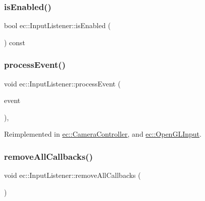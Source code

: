 \mbox{\label{classec_1_1_input_listener_a6d7a4e04543e3a86745261d9fefcbfc1}} 
\subsubsection{\texorpdfstring{is\+Enabled()}{isEnabled()}}
{\footnotesize\ttfamily bool ec\+::\+Input\+Listener\+::is\+Enabled (\begin{DoxyParamCaption}{ }\end{DoxyParamCaption}) const\hspace{0.3cm}{\ttfamily [virtual]}}

\mbox{\label{classec_1_1_input_listener_a9ceaefc79c6b0b260e88454616137840}} 
\subsubsection{\texorpdfstring{process\+Event()}{processEvent()}}
{\footnotesize\ttfamily void ec\+::\+Input\+Listener\+::process\+Event (\begin{DoxyParamCaption}\item[{const \mbox{\hyperlink{structec_1_1_input_event}{Input\+Event}} \&}]{event }\end{DoxyParamCaption})\hspace{0.3cm}{\ttfamily [protected]}, {\ttfamily [virtual]}}



Reimplemented in \mbox{\hyperlink{classec_1_1_camera_controller_af44aad5f80005eaadf5d637b3b00c6d6}{ec\+::\+Camera\+Controller}}, and \mbox{\hyperlink{classec_1_1_open_g_l_input_a064a4e318e18d79ad8df19c789f84686}{ec\+::\+Open\+G\+L\+Input}}.

\mbox{\label{classec_1_1_input_listener_ab3c4085477da60677e0a0659f750ead4}} 
\subsubsection{\texorpdfstring{remove\+All\+Callbacks()}{removeAllCallbacks()}}
{\footnotesize\ttfamily void ec\+::\+Input\+Listener\+::remove\+All\+Callbacks (\begin{DoxyParamCaption}{ }\end{DoxyParamCaption})}

